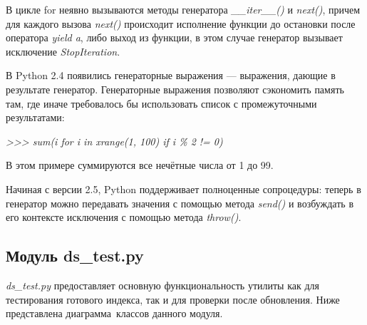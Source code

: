 В цикле for неявно вызываются методы генератора \textit{\_\_iter\_\_()} и \textit{next()},
причем для каждого вызова \textit{next()} происходит исполнение функции до остановки после 
оператора \textit{yield a}, либо выход из функции, в этом случае генератор 
вызывает исключение \textit{StopIteration}.

В Python 2.4 появились генераторные выражения — выражения, дающие в результате генератор. 
Генераторные выражения позволяют сэкономить память там, где иначе требовалось бы использовать список с промежуточными результатами:

\textit{ >>> sum(i for i in xrange(1, 100) if i \% 2 != 0)}

В этом примере суммируются все нечётные числа от 1 до 99.

Начиная с версии 2.5, Python поддерживает полноценные сопроцедуры: теперь в генератор можно передавать значения 
с помощью метода \textit{send()} и возбуждать в его контексте исключения с помощью метода \textit{throw()}.
\label{sn:ds-test}
\subsection{Модуль ds\_test.py}
\textit{ds\_test.py} предоставляет основную функциональность утилиты  как для тестирования
готового индекса, так и для проверки после обновления. Ниже представлена диаграмма~классов данного модуля.\\

